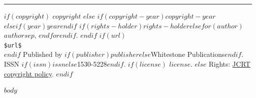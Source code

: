 \documentclass[11pt]{article}
\begin{document}
\begin{center}
  \vfill
  \rule{\textwidth}{0.4pt}
  \vspace{0.08in}

  {\small
  $if(copyright)$
    $copyright$
  $else$
    \textcopyright{} $if(copyright-year)$$copyright-year$$elseif(year)$$year$$endif$
    $if(rights-holder)$$rights-holder$$else$$for(author)$$author$$sep$, $endfor$$endif$.
  $endif$
$if(url)$
  \\[0.04in]{\ttfamily\nolinkurl{$url$}}\\[0.04in]
$endif$
  Published by $if(publisher)$$publisher$$else$Whitestone Publications$endif$.
  ISSN $if(issn)$$issn$$else$1530-5228$endif$.
  $if(license)$
    \href{$if(license-url)$$license-url$$else$https://jcrt.org/copyright/$endif$}{$license$}.
  $else$
    Rights: \href{$if(license-url)$$license-url$$else$https://jcrt.org/copyright/$endif$}{JCRT copyright policy}.
  $endif$
  }
\end{center}

\clearpage

$body$
\end{document}
